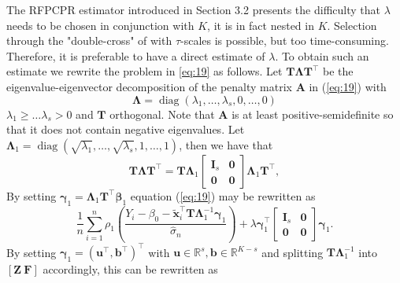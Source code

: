 \documentclass[11pt]{article}
\DeclareMathOperator{\diag}{diag}
\begin{document}
The RFPCPR estimator introduced in Section 3.2 presents the difficulty that $\lambda$ needs to be chosen in conjunction with $K$, it is in fact nested in $K$. Selection through the "double-cross" of \citep{stone1974cross} with $\tau$-scales is possible, but too time-consuming. Therefore,  it is preferable to have a direct estimate of $\lambda$. To obtain such an estimate we rewrite the problem in \eqref{eq:19} as follows. Let $\mathbf{T} \mathbf{\Lambda} \mathbf{T}^{\top}$ be the eigenvalue-eigenvector decomposition of the penalty matrix $\mathbf{A}$ in (\ref{eq:19}) with 
\begin{equation*}
\mathbf{\Lambda} = \diag \left( \lambda_1, \ldots, \lambda_s, 0, \ldots, 0 \right)
\end{equation*}
$\lambda_1 \geq \ldots \lambda_s >0$ and $\mathbf{T}$ orthogonal. Note that $\mathbf{A}$ is at least positive-semidefinite so that it does not contain negative eigenvalues. Let $\mathbf{\Lambda}_1 = \diag\left( \sqrt{\lambda_1}, \ldots, \sqrt{\lambda_s}, 1, \ldots, 1 \right) $, then we have that
\begin{equation*}
\mathbf{T} \mathbf{\Lambda} \mathbf{T}^{\top} = \mathbf{T} \mathbf{\Lambda}_1 \begin{bmatrix}
\mathbf{I}_s & \mathbf{0} \\ \mathbf{0} &\mathbf{0}  
\end{bmatrix} \mathbf{\Lambda}_1 \mathbf{T}^{\top},
\end{equation*}
By setting $\boldsymbol{\gamma}_1 = \mathbf{\Lambda}_1 \mathbf{T}^{\top} \boldsymbol{\beta}_1$ equation (\ref{eq:19}) may be rewritten as
\begin{equation}
\label{eq:26}
\frac{1}{n} \sum_{i=1}^n \rho_1 \left( \frac{Y_i - \beta_0 - \mathbf{\widetilde{x}}_i^{\top} \mathbf{T} \boldsymbol{\Lambda}_1^{-1}  \boldsymbol{\gamma}_1   }{\widehat{\sigma}_n} \right) + \lambda \boldsymbol{\gamma}_1^{\top} \begin{bmatrix}
\mathbf{I}_s & \mathbf{0} \\ \mathbf{0} &\mathbf{0}  
\end{bmatrix} \boldsymbol{\gamma}_1.
\end{equation}
By setting $\boldsymbol{\gamma}_1 = \left(\mathbf{u}^{\top}, \mathbf{b}^{\top} \right)^{\top}$ with  $\mathbf{u} \in \mathbb{R}^s, \mathbf{b} \in \mathbb{R}^{K-s}$ and splitting $\mathbf{T} \mathbf{\Lambda}_1^{-1}$ into $\left[\mathbf{Z} \  \mathbf{F} \right]$ accordingly, this can be rewritten as
\end{document}
